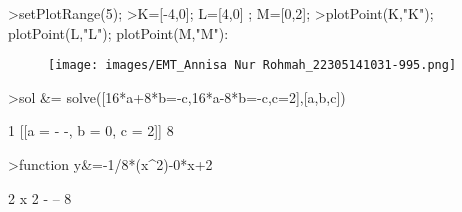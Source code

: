 \documentclass[a4paper,10pt]{article}
\begin{document}
\begin{eulernotebook}
\begin{eulercomment}
\begin{eulercomment}
\begin{eulercomment}
\begin{eulercomment}
\begin{eulercomment}
\end{eulercomment}
\begin{eulerprompt}
>setPlotRange(5); 
>K=[-4,0];  L=[4,0] ; M=[0,2];
>plotPoint(K,"K"); plotPoint(L,"L"); plotPoint(M,"M"): 
\end{eulerprompt}
\begin{figure}[h]
    \centering
    \texttt{[image: images/EMT\_Annisa Nur Rohmah\_22305141031-995.png]}
\end{figure}
\begin{eulerprompt}
>sol &= solve([16*a+8*b=-c,16*a-8*b=-c,c=2],[a,b,c])
\end{eulerprompt}
\begin{euleroutput}
  
                                1
                        [[a = - -, b = 0, c = 2]]
                                8
  
\end{euleroutput}
\begin{eulerprompt}
>function y&=-1/8*(x^2)-0*x+2
\end{eulerprompt}
\begin{euleroutput}
  
                                       2
                                      x
                                  2 - --
                                      8
  

\end{euleroutput}
\end{eulercomment}
\end{eulercomment}
\end{eulercomment}
\end{eulercomment}
\end{eulernotebook}
\end{document}

